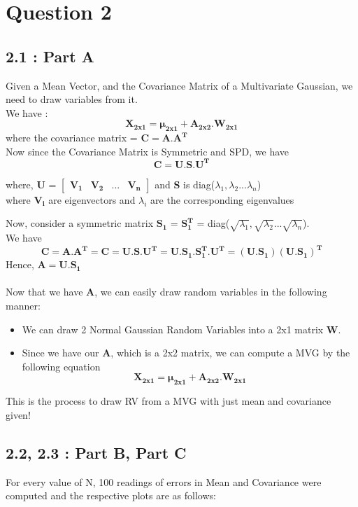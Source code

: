 \documentclass[12pt, a4paper]{article}
\begin{document}
\section*{Question 2}
\subsection*{2.1 : Part A}
\hspace{1cm} Given a Mean Vector, and the Covariance Matrix of a Multivariate Gaussian, we need to draw variables from it. \\ 
We have : 
$$\mathbf{X_{2x1} = \boldsymbol{\mu}_{2x1} + A_{2x2}.W_{2x1}}$$
where the covariance matrix = $\mathbf{C = A.A^T}$ \\
Now since the Covariance Matrix is Symmetric and SPD, we have 
$$\mathbf{C = U.S.U^T}$$
\begin{flushright}
where, \textbf{U} = $\begin{bmatrix}
\mathbf{V_1} & \mathbf{V_2} & ... & \mathbf{V_n}
\end{bmatrix} $ and \textbf{S} is diag($\lambda_1,\lambda_2 ... \lambda_n $) \\
where $\mathbf{V_i}$ are eigenvectors and $\lambda_i$ are the corresponding eigenvalues \\
\end{flushright}
Now, consider a symmetric matrix $\mathbf{S_1}$ = $\mathbf{S_1^T}$ = diag($\sqrt{\lambda_1},\sqrt{\lambda_2} ... \sqrt{\lambda_n} $). \\We have
$$\mathbf{C = A.A^T = C = U.S.U^T = U.S_1.S_1^T.U^T = (U.S_1)(U.S_1)^T}$$
Hence, $\mathbf{A = U.S_1}$ \\ \\
Now that we have \textbf{A}, we can easily draw random variables in the following manner: 
\begin{itemize}
\item We can draw 2 Normal Gaussian Random Variables into a 2x1 matrix \textbf{W}.
\item  Since we have our \textbf{A}, which is a 2x2 matrix, we can compute a MVG by the following equation
$$\mathbf{X_{2x1} = \boldsymbol{\mu}_{2x1} + A_{2x2}.W_{2x1}}$$
\end{itemize}

This is the process to draw RV from a MVG with just mean and covariance given!
\newpage
\subsection*{2.2, 2.3 : Part B, Part C}
For every value of N, 100 readings of errors in Mean and Covariance were computed and the respective plots are as follows: \\
\end{document}
